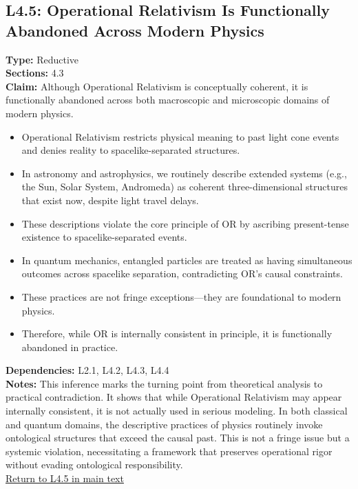 \documentclass[12pt]{book}
\newcommand{\returnlink}[1]{\hyperref[logic:#1]{Return to #1 in main text}\xspace}
\begin{document}
\subsection*{L4.5: Operational Relativism Is Functionally Abandoned Across Modern Physics}\label{appendix:L4.5}
\textbf{Type:} Reductive \\
\textbf{Sections:} 4.3 \\
\textbf{Claim:} Although Operational Relativism is conceptually coherent, it is functionally abandoned across both macroscopic and microscopic domains of modern physics.
\begin{itemize}
  \item Operational Relativism restricts physical meaning to past light cone events and denies reality to spacelike-separated structures.
  \item In astronomy and astrophysics, we routinely describe extended systems (e.g., the Sun, Solar System, Andromeda) as coherent three-dimensional structures that exist now, despite light travel delays.
  \item These descriptions violate the core principle of OR by ascribing present-tense existence to spacelike-separated events.
  \item In quantum mechanics, entangled particles are treated as having simultaneous outcomes across spacelike separation, contradicting OR's causal constraints.
  \item These practices are not fringe exceptions---they are foundational to modern physics.
  \item Therefore, while OR is internally consistent in principle, it is functionally abandoned in practice.
\end{itemize}
\textbf{Dependencies:} L2.1, L4.2, L4.3, L4.4 \\
\textbf{Notes:} This inference marks the turning point from theoretical analysis to practical contradiction. It shows that while Operational Relativism may appear internally consistent, it is not actually used in serious modeling. In both classical and quantum domains, the descriptive practices of physics routinely invoke ontological structures that exceed the causal past. This is not a fringe issue but a systemic violation, necessitating a framework that preserves operational rigor without evading ontological responsibility. \\
\returnlink{L4.5}
\end{document}
